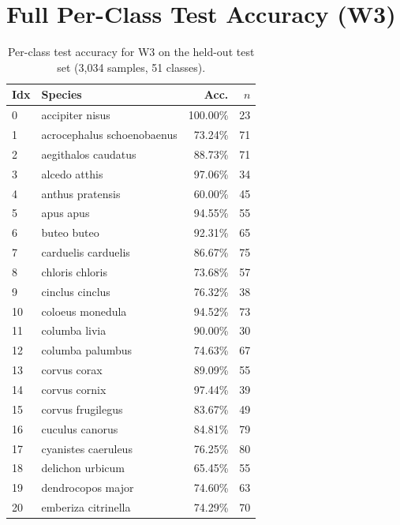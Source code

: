 \documentclass[conference]{IEEEtran}
\begin{document}
\appendix
\section{Full Per-Class Test Accuracy (W3)}

\begin{table}[h]
\centering
\caption{Per-class test accuracy for W3 on the held-out test set (3,034 samples, 51 classes).}
\label{tab:full_perclass}
\small
\begin{tabular}{llrr}
\toprule
\textbf{Idx} & \textbf{Species} & \textbf{Acc.} & \textbf{$n$} \\
\midrule
0  & accipiter nisus            & 100.00\% & 23 \\
1  & acrocephalus schoenobaenus &  73.24\% & 71 \\
2  & aegithalos caudatus        &  88.73\% & 71 \\
3  & alcedo atthis              &  97.06\% & 34 \\
4  & anthus pratensis           &  60.00\% & 45 \\
5  & apus apus                  &  94.55\% & 55 \\
6  & buteo buteo                &  92.31\% & 65 \\
7  & carduelis carduelis        &  86.67\% & 75 \\
8  & chloris chloris            &  73.68\% & 57 \\
9  & cinclus cinclus            &  76.32\% & 38 \\
10 & coloeus monedula           &  94.52\% & 73 \\
11 & columba livia              &  90.00\% & 30 \\
12 & columba palumbus           &  74.63\% & 67 \\
13 & corvus corax               &  89.09\% & 55 \\
14 & corvus cornix              &  97.44\% & 39 \\
15 & corvus frugilegus          &  83.67\% & 49 \\
16 & cuculus canorus            &  84.81\% & 79 \\
17 & cyanistes caeruleus        &  76.25\% & 80 \\
18 & delichon urbicum           &  65.45\% & 55 \\
19 & dendrocopos major          &  74.60\% & 63 \\
20 & emberiza citrinella        &  74.29\% & 70 \\

\end{tabular}
\end{table}
\end{document}
